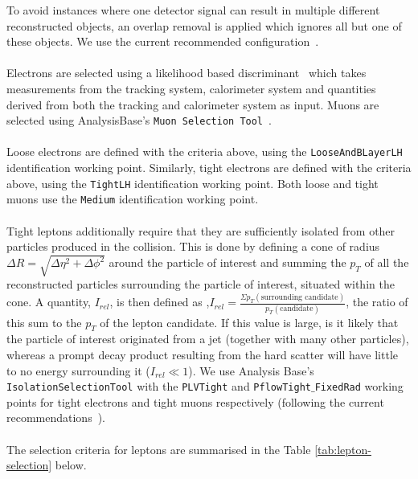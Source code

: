 To avoid instances where one detector signal can result in multiple different reconstructed objects, an overlap removal is applied which ignores all but one of these objects. We use the current recommended configuration~\cite{Overlap-removal-slides}.\\\\

Electrons are selected using a likelihood based discriminant~\cite{electronRecoAndID:paper} which takes measurements from the tracking system, calorimeter system and quantities derived from both the tracking and calorimeter system as input. Muons are selected using AnalysisBase's \texttt{Muon Selection Tool}~\cite{muon-selection-tool}.\\\\

Loose electrons are defined with the criteria above, using the \texttt{LooseAndBLayerLH} identification working point. Similarly, tight electrons are defined with the criteria above, using the \texttt{TightLH} identification working point. Both loose and tight muons use the \texttt{Medium} identification working point.\\\\

Tight leptons additionally require that they are sufficiently isolated from other particles produced in the collision. This is done by defining a cone of radius $\Delta R = \sqrt{\Delta \eta^{2} + \Delta \phi^{2}}$ around the particle of interest and summing the $p_{T}$ of all the reconstructed particles surrounding the particle of interest, situated within the cone. A quantity, $I_{rel}$, is then defined as ,$I_{rel} = \frac{\Sigma p_{T}(\text{surrounding candidate})  }{p_{T}(\text{candidate})}$, the ratio of this sum to the $p_{T}$ of the lepton candidate. If this value is large, is it likely that the particle of interest originated from a jet (together with many other particles), whereas a prompt decay product resulting from the hard scatter will have little to no energy surrounding it ($I_{rel} \ll 1$). We use Analysis Base's \texttt{IsolationSelectionTool} with the \texttt{PLVTight} and \texttt{PflowTight$\_$FixedRad} working points for tight electrons and tight muons respectively (following the current recommendations~\cite{recommendedIsolationWPs}).\\\\
The selection criteria for leptons are summarised in the Table \ref{tab:lepton-selection} below. 




